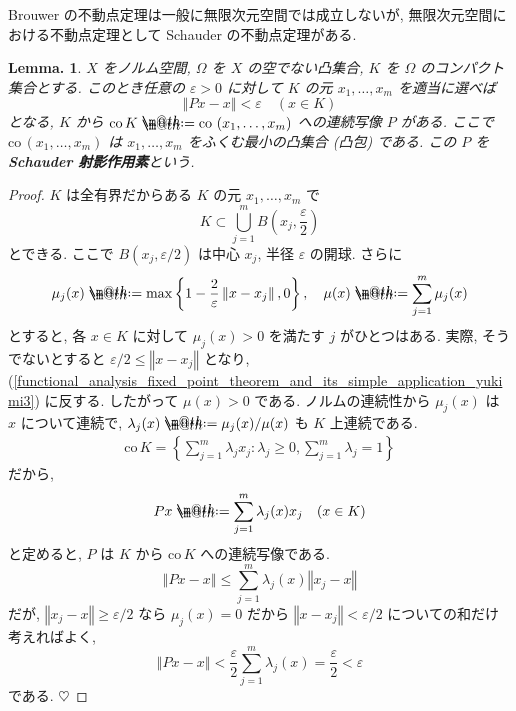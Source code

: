 \documentclass[openany, a4paper, oneside]{book}
\makeatletter
\newcommand*{\defeq}{\mathrel{\rlap{%
\raisebox{0.3ex}{$\m@th\cdot$}}%
\raisebox{-0.3ex}{$\m@th\cdot$}}%
=}
\newcommand{\co}{\mathrm{co}\,}
\theoremstyle{break}
\newtheorem{lem}[thm]{Lemma.}
\theoremstyle{breakdefn}
\newcommand{\norm}[1]{\left\Vert#1\right\Vert}
\newcommand{\rbk}[1]{\left (#1\right)}
\newcommand{\cbk}[1]{\left\{#1\right\}}
\newcommand{\set}[2]{\left\{#1 : #2\right\}}
\makeatother
\begin{document}
Brouwer の不動点定理は一般に無限次元空間では成立しないが,
無限次元空間における不動点定理として Schauder の不動点定理がある.
\begin{lem}
 $X$ をノルム空間, $\Omega$ を $X$ の空でない凸集合,
 $K$ を $\Omega$ のコンパクト集合とする.
 このとき任意の $\varepsilon > 0$ に対して $K$ の元 $x_1, \dots , x_m$ を適当に選べば
 \begin{equation}
  \norm{Px - x}
  <
  \varepsilon \quad \rbk{x \in K}
 \end{equation}
 となる, $K$ から $\co K \defeq \co \rbk{x_1, \dots , x_m}$ への連続写像 $P$ がある.
 ここで $\co \rbk{x_1, \dots , x_m}$ は
 $x_1, \dots , x_m$ をふくむ最小の凸集合 (凸包) である.
 この $P$ を\textbf{Schauder 射影作用素}という.
\end{lem}
\begin{proof}
$K$ は全有界だからある $K$ の元 $x_1, \dots , x_m$ で
\begin{equation}\label{functional_analysis_fixed_point_theorem_and_its_simple_application_yukimi3}
 K
 \subset
 \bigcup_{j=1}^m B \rbk{x_j, \frac{\varepsilon}{2}}
\end{equation}
とできる.
ここで $B (x_j, \varepsilon / 2)$ は中心 $x_j$, 半径 $\varepsilon$ の開球.
さらに
\begin{equation}
 \mu_j(x)
 \defeq
 \max \cbk{1 - \frac{2}{\varepsilon} \norm{x - x_j}, 0}, \quad
 \mu (x)
 \defeq
 \sum_{j=1}^m \mu_j (x)
\end{equation}
とすると, 各 $x \in K$ に対して $\mu_j (x) > 0$ を満たす $j$ がひとつはある.
実際, そうでないとすると $\varepsilon / 2 \le \norm{x - x_j}$ となり,
(\ref{functional_analysis_fixed_point_theorem_and_its_simple_application_yukimi3}) に反する.
したがって $\mu (x) > 0$ である.
ノルムの連続性から $\mu_j (x)$ は $x$ について連続で,
$\lambda_j (x) \defeq \mu_j (x) / {\mu (x)}$ も $K$ 上連続である.
\begin{align}
 \co K
 =
 \set{\sum_{j=1}^m \lambda_j x_j}{\lambda_j \ge 0, \sum_{j=1}^m \lambda_j = 1}
\end{align}
だから,
\begin{equation}
 Px
 \defeq
 \sum_{j=1}^m \lambda_j (x) x_j \quad (x \in K)
\end{equation}
と定めると, $P$ は $K$ から $\co K$ への連続写像である.
\begin{equation}
 \norm{Px - x}
 \le
 \sum_{j=1}^m \lambda_j (x) \norm{x_j - x}
\end{equation}
だが,  $\norm{x_j - x} \ge \varepsilon / 2$ なら $\mu_j (x) = 0$ だから $\norm{x - x_j} < \varepsilon / 2$ についての和だけ考えればよく,
\begin{equation}
 \norm{Px - x}
 <
 \frac{\varepsilon}{2} \sum_{j=1}^m \lambda_j (x)
 =
 \frac{\varepsilon} {2}
 < \varepsilon
\end{equation}
である.
$\heartsuit$
\end{proof}
\end{document}
